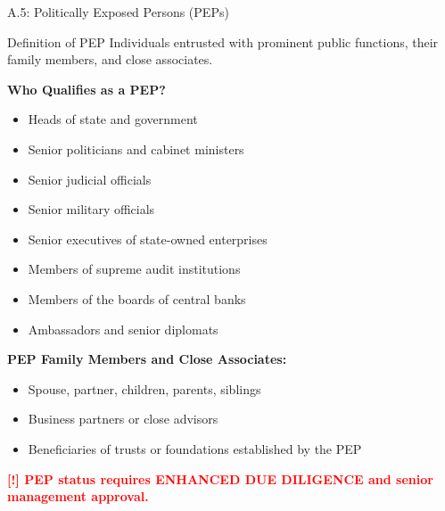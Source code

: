 \documentclass[11pt,a4paper]{beamer}
\newcommand{\redflag}[1]{\textcolor{red}{\textbf{[!] #1}}}
\begin{document}
	\begin{frame}{A.5: Politically Exposed Persons (PEPs)}
		\begin{block}{Definition of PEP}
			Individuals entrusted with prominent public functions, their family members, and close associates.
		\end{block}
		\textbf{Who Qualifies as a PEP?}
		\begin{itemize}
			\item Heads of state and government
			\item Senior politicians and cabinet ministers
			\item Senior judicial officials
			\item Senior military officials
			\item Senior executives of state-owned enterprises
			\item Members of supreme audit institutions
			\item Members of the boards of central banks
			\item Ambassadors and senior diplomats
		\end{itemize}
		\textbf{PEP Family Members and Close Associates:}
		\begin{itemize}
			\item Spouse, partner, children, parents, siblings
			\item Business partners or close advisors
			\item Beneficiaries of trusts or foundations established by the PEP
		\end{itemize}
		\redflag{PEP status requires ENHANCED DUE DILIGENCE and senior management approval.}
	\end{frame}
	
\end{document}
